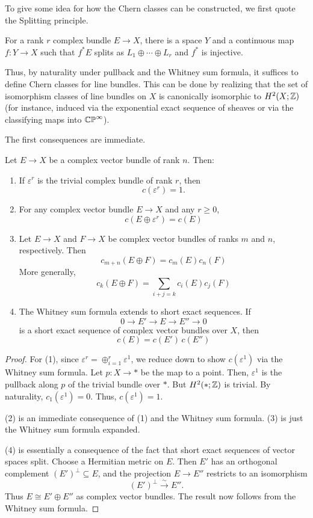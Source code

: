 \documentclass[12pt]{article}
\begin{document}
To give some idea for how the Chern classes can be constructed, we first quote the Splitting principle. 
\begin{theorem}
    For a rank $r$ complex bundle $E \to X$, there is a space $Y$ and a continuous map $f: Y \to X$ such that $f^* E$ splits as $L_1 \oplus \cdots \oplus L_r$ and $f^*$ is injective.  
\end{theorem}
Thus, by naturality under pullback and the Whitney sum formula, it suffices to define Chern classes for line bundles. This can be done by realizing that the set of isomorphism classes of line bundles on $X$ is canonically isomorphic to $H^2(X;\mathbb Z)$ (for instance, induced via the exponential exact sequence of sheaves or via the classifying maps into $\mathbb{CP}^\infty$). 

The first consequences are immediate.

\begin{proposition}
Let \(E\to X\) be a complex vector bundle of rank \(n\). Then:
\begin{enumerate}
    \item If \(\varepsilon^r\) is the trivial complex bundle of rank \(r\), then
    \[
    c(\varepsilon^r)=1.
    \]
    \item For any complex vector bundle \(E\to X\) and any \(r\geq 0\),
    \[ c(E\oplus \varepsilon^r)=c(E) \]
    \item Let \(E\to X\) and \(F\to X\) be complex vector bundles of ranks \(m\) and \(n\), respectively. Then
    \[ c_{m+n}(E\oplus F)=c_m(E)c_n(F) \]
    More generally,
    \[ c_k(E\oplus F)=\sum_{i+j=k} c_i(E)c_j(F) \]
    \item The Whitney sum formula extends to short exact sequences. If
        \[ 0\to E' \to E \to E'' \to 0 \]
    is a short exact sequence of complex vector bundles over \(X\), then
        \[ c(E)=c(E')\,c(E'') \]
\end{enumerate}
\end{proposition}

\begin{proof}
For (1), since $\varepsilon^r = \oplus_{i=1}^r \varepsilon^1$, we reduce down to show $c(\varepsilon^1)$ via the Whitney sum formula. Let $p: X \to *$ be the map to a point. Then, $\varepsilon^1$ is the pullback along $p$ of the trivial bundle over $*$. But $H^2(*; \mathbb Z)$ is trivial. By naturality, $c_1(\varepsilon^1) = 0$. Thus, $c(\varepsilon^1) = 1$. 

(2) is an immediate consequence of (1) and the Whitney sum formula. (3) is just the Whitney sum formula expanded. 

(4) is essentially a consequence of the fact that short exact sequences of vector spaces split. Choose a Hermitian metric on \(E\). Then \(E'\) has an orthogonal complement \((E')^\perp\subseteq E\), and the projection \(E\to E''\) restricts to an isomorphism
\[
(E')^\perp \xrightarrow{\sim} E''.
\]
Thus \(E\cong E'\oplus E''\) as complex vector bundles. The result now follows from the Whitney sum formula.
\end{proof}
\end{document}
